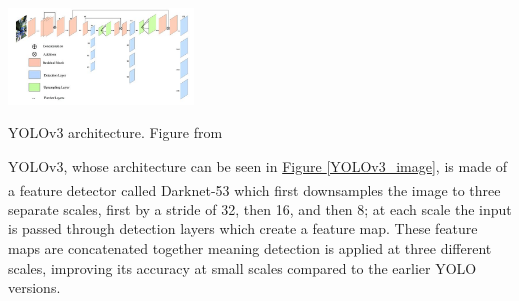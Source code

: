 \documentclass[11pt]{article}		%
\newcommand{\supercite}[1]{\textsuperscript{\cite{#1}}}		%
\newcommand{\figref}[1]{\hyperref[#1]{Figure \ref*{#1}}}    %
\begin{document}
	        \begin{floatingfigure}[r]{0.4\textwidth}
				\centering
			    \includegraphics[width=0.37\textwidth]{Network-architecture-of-YOLOv3_W640.jpg}
			    \caption{YOLOv3 architecture. Figure from \cite{YOLOv3_image}}
			    \label{YOLOv3_image}
			\end{floatingfigure}
			
            \hspace*{3ex}YOLOv3, whose architecture can be seen in \figref{YOLOv3_image}, is made of a feature detector called Darknet-53\supercite{YOLOV3} which first downsamples the image to three separate scales, first by a stride of 32, then 16, and then 8; at each scale the input is passed through detection layers which create a feature map. These feature maps are concatenated together meaning detection is applied at three different scales, improving its accuracy at small scales compared to the earlier YOLO versions.
 
			\begin{floatingfigure}[r]{0pt} \end{floatingfigure}
			
\end{document}
